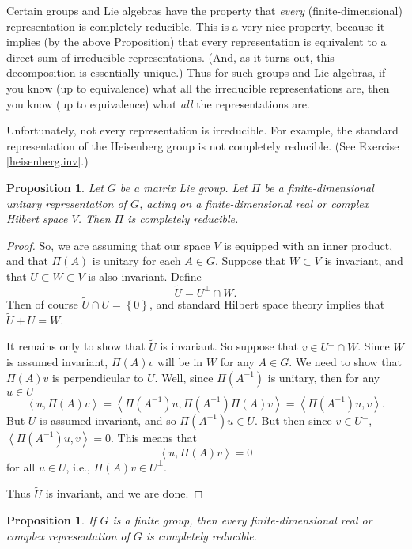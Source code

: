\documentclass{amsbook}
\theoremstyle{plain}
\newtheorem{proposition}[theorem]{Proposition}
\numberwithin{equation}{chapter}
\numberwithin{theorem}{chapter}
\begin{document}
Certain groups and Lie algebras have the property that \textit{every}
(finite-dimensional) representation is completely reducible. This is a very
nice property, because it implies (by the above Proposition) that every
representation is equivalent to a direct sum of irreducible representations.
(And, as it turns out, this decomposition is essentially unique.) Thus for
such groups and Lie algebras, if you know (up to equivalence) what all the
irreducible representations are, then you know (up to equivalence) what
\textit{all} the representations are.

Unfortunately, not every representation is irreducible. For example, the
standard representation of the Heisenberg group is not completely reducible.
(See Exercise \ref{heisenberg.inv}.)

\begin{proposition}
\label{unitary.reduce}Let $G$ be a matrix Lie group. Let $\Pi$ be a
finite-dimensional unitary representation of $G$, acting on a
finite-dimensional real or complex Hilbert space $V$. Then $\Pi$ is completely reducible.
\end{proposition}

\begin{proof}
So, we are assuming that our space $V$ is equipped with an inner product, and
that $\Pi(A)$ is unitary for each $A\in G$. Suppose that $W\subset V$ is
invariant, and that $U\subset W\subset V$ is also invariant. Define
\[
\widetilde{U}=U^{\perp}\cap W\text{.}%
\]
Then of course $\widetilde{U}\cap U=\left\{  0\right\}  $, and standard
Hilbert space theory implies that $\widetilde{U}+U=W$.

It remains only to show that $\widetilde{U}$ is invariant. So suppose that
$v\in U^{\perp}\cap W$. Since $W$ is assumed invariant, $\Pi(A)v$ will be in
$W$ for any $A\in G$. We need to show that $\Pi(A)v$ is perpendicular to $U$.
Well, since $\Pi(A^{-1})$ is unitary, then for any $u\in U$%
\[
\left\langle u,\Pi(A)v\right\rangle =\left\langle \Pi(A^{-1})u,\Pi(A^{-1}%
)\Pi(A)v\right\rangle =\left\langle \Pi(A^{-1})u,v\right\rangle \text{.}%
\]
But $U$ is assumed invariant, and so $\Pi(A^{-1})u\in U$. But then since $v\in
U^{\perp}$, $\left\langle \Pi(A^{-1})u,v\right\rangle =0$. This means that
\[
\left\langle u,\Pi(A)v\right\rangle =0
\]
for all $u\in U$, i.e., $\Pi(A)v\in U^{\perp}$.

Thus $\widetilde{U}$ is invariant, and we are done.
\end{proof}

\begin{proposition}
\label{finite.reduce}If $G$ is a finite group, then every finite-dimensional
real or complex representation of $G$ is completely reducible.
\end{proposition}
\end{document}
